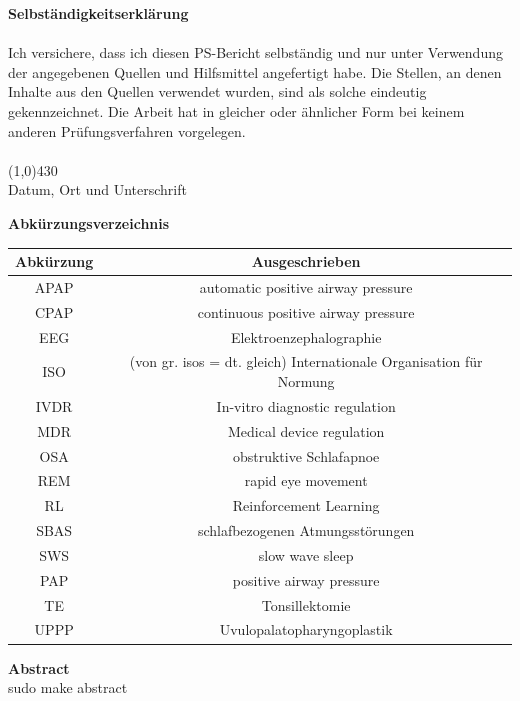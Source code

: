 \documentclass[a4paper, 12pt]{article}
\begin{document}
\newpage
{\bfseries \large Selbständigkeitserklärung}\\ \\
Ich versichere, dass ich diesen PS-Bericht selbständig und nur unter Verwendung der angegebenen
Quellen und Hilfsmittel angefertigt habe. Die Stellen, an denen Inhalte aus den Quellen verwendet
wurden, sind als solche eindeutig gekennzeichnet. Die Arbeit hat in gleicher oder ähnlicher Form bei
keinem anderen Prüfungsverfahren vorgelegen. \\
\vspace{1.0cm} \\
\line(1,0){430} \\
Datum, Ort und Unterschrift\\

\newpage


\newpage
{\bfseries \large Abkürzungsverzeichnis}\\
\begin{table}[h!]
\centering
\begin{tabular}{c | c}
\hline
\textbf{Abkürzung} & \textbf{Ausgeschrieben} \\ 
\hline 
APAP & automatic positive airway pressure \\
CPAP & continuous positive airway pressure \\
EEG & Elektroenzephalographie \\
ISO & (von gr. isos = dt. gleich) Internationale Organisation für Normung \\
IVDR & In-vitro diagnostic regulation \\
MDR & Medical device regulation \\
OSA & obstruktive Schlafapnoe \\ 
REM & rapid eye movement \\
RL & Reinforcement Learning \\
SBAS & schlafbezogenen Atmungsstörungen \\ 
SWS & slow wave sleep \\
PAP & positive airway pressure \\
TE & Tonsillektomie \\
UPPP & Uvulopalatopharyngoplastik \\
\end{tabular} 
\end{table}

\newpage
{\bfseries \large Abstract}\\
sudo make abstract 
\end{document}
